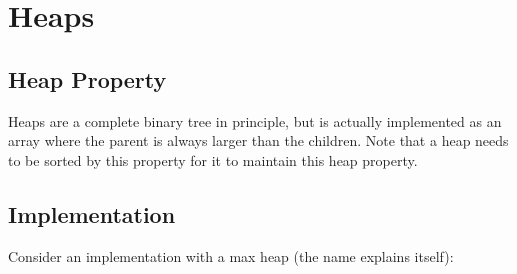 \documentclass[11pt,a4paper,english]{report}
\begin{document}
\section{Heaps}

\subsection{Heap Property}

Heaps are a complete binary tree in principle, but is actually implemented as an array where the parent is always larger than the children. Note that a heap needs to be sorted by this property for it to maintain this heap property.

\subsection{Implementation}

Consider an implementation with a max heap (the name explains itself):
\end{document}
